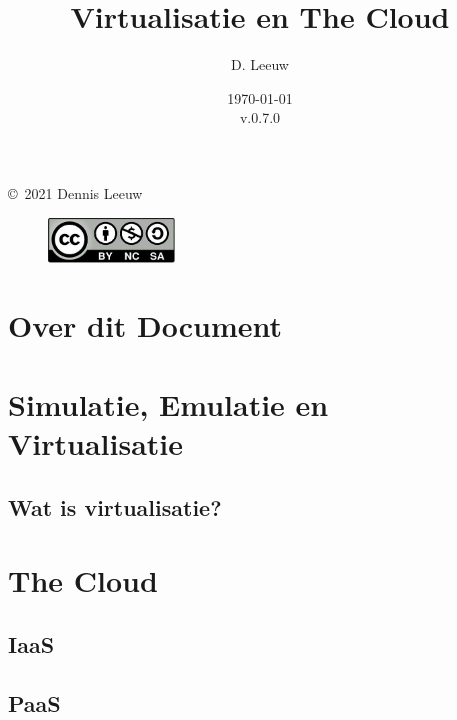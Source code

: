 \documentclass[a4paper,12pt,twoside,openright,titlepage]{book}
\author{D. Leeuw}
\title{Virtualisatie en The Cloud}
\date{\today\\v.0.7.0}
\begin{document}

\maketitle

\copyright\ 2021 Dennis Leeuw\\

\begin{figure}[H]
\includegraphics[width=0.3\textwidth]{CC-BY-SA-NC.png}
\end{figure}

\bigskip




\frontmatter
\chapter{Over dit Document}



\tableofcontents

\mainmatter
\chapter{Simulatie, Emulatie en Virtualisatie}

\section{Wat is virtualisatie?}



\chapter{The Cloud}

\section{IaaS}

\section{PaaS}

\end{document}
